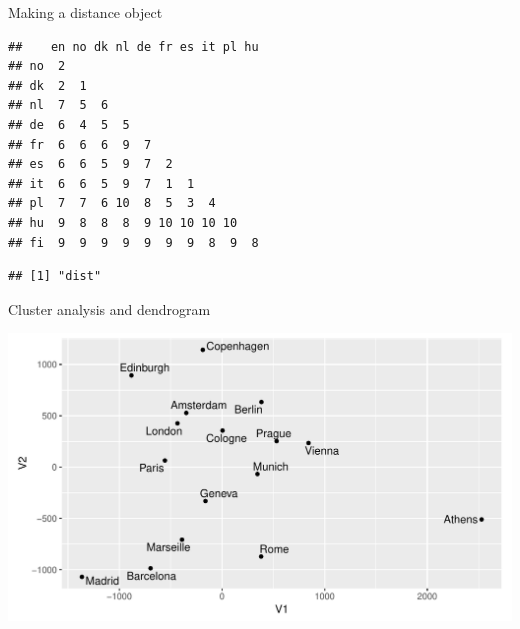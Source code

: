 \begin{frame}[fragile]{Making a distance object}
  
\begin{knitrout}\small
{}\color{fgcolor}\begin{kframe}
\begin{alltt}
\hlkwb{=}
\end{alltt}
\begin{verbatim}
##    en no dk nl de fr es it pl hu
## no  2                           
## dk  2  1                        
## nl  7  5  6                     
## de  6  4  5  5                  
## fr  6  6  6  9  7               
## es  6  6  5  9  7  2            
## it  6  6  5  9  7  1  1         
## pl  7  7  6 10  8  5  3  4      
## hu  9  8  8  8  9 10 10 10 10   
## fi  9  9  9  9  9  9  9  8  9  8
\end{verbatim}
\begin{alltt}
\end{alltt}
\begin{verbatim}
## [1] "dist"
\end{verbatim}
\end{kframe}
\end{knitrout}
  
\end{frame}

\begin{frame}[fragile]{Cluster analysis and dendrogram}
  
\begin{knitrout}
\color{fgcolor}\begin{kframe}
\begin{alltt}
\hlkwb{=}\hlstd{=}\hlstd{)}
\end{alltt}
\end{kframe}
\includegraphics[width=\maxwidth]{figure/unnamed-chunk-9-1} 

\end{knitrout}
  
\end{frame}

